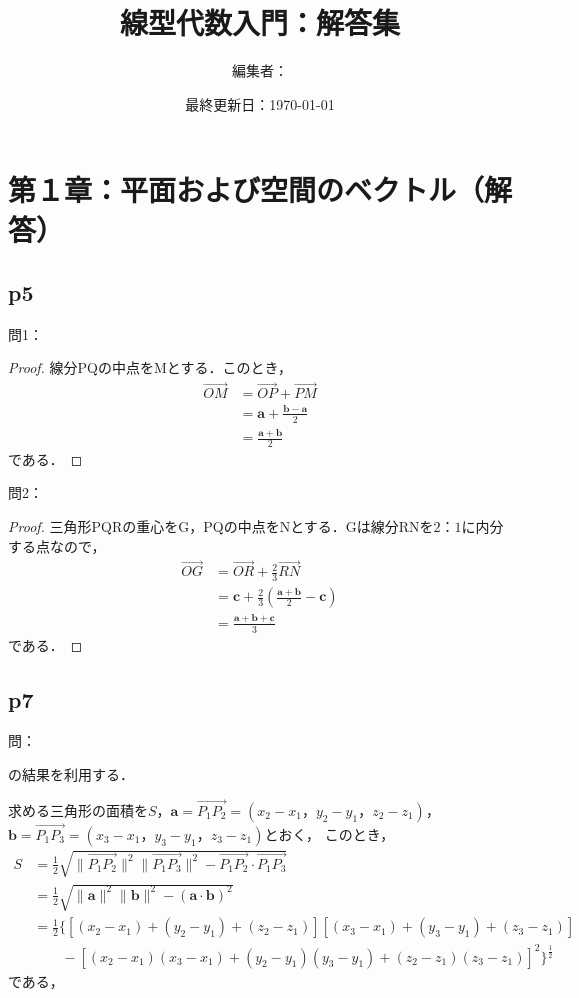 \documentclass[dvipdfmx,uplatex,11pt]{jsarticle}
\title{線型代数入門：解答集}
\author{編集者：}
\date{最終更新日：\today}
\begin{document}
\maketitle
\tableofcontents
\newpage
%
%
%
\section{第１章：平面および空間のベクトル（解答）}
%
\subsection{p5}

問1：

\begin{leftbar}
	\begin{proof}
		線分PQの中点をMとする．このとき，
		\begin{align*}
		\overrightarrow{OM} & = \overrightarrow{OP} + \overrightarrow{PM} \\
		& = \bm{a} + \frac{\bm{b}-\bm{a}}{2} \\
		& = \frac{\bm{a}+\bm{b}}{2}
		\end{align*}
		である．
	\end{proof}
\end{leftbar}

問2：
\begin{leftbar}
	\begin{proof}
		三角形PQRの重心をG，PQの中点をNとする．Gは線分RNを$2：1$に内分する点なので，
		\begin{align*}
			\overrightarrow{OG} &= \overrightarrow{OR} + \frac{2}{3} \overrightarrow{RN} \\
			& = \bm{c}+ \frac{2}{3} \left(\frac{\bm{a}+\bm{b}}{2}-\bm{c} \right)\\
			& = \frac{\bm{a}+\bm{b}+\bm{c}}{3}
		\end{align*}
		である．
	\end{proof}
\end{leftbar}

\newpage

\subsection{p7}

問： 
\begin{leftbar}
	[1.4]の結果を利用する．\par 
	求める三角形の面積を$S$，$\bm{a}=\overrightarrow{P_1 P_2}=(x_2-x_1，y_2-y_1，z_2-z_1)$，$\bm{b}=\overrightarrow{P_1 P_3}=(x_3-x_1，y_3-y_1，z_3-z_1)$とおく，
	このとき，
	\begin{align*}
		S & = \frac{1}{2} \sqrt{\|\overrightarrow{P_1 P_2}\|^2 \|\overrightarrow{P_1 P_3}\|^2 - \overrightarrow{P_1 P_2} \cdot \overrightarrow{P_1 P_3}} \\
		  & = \frac{1}{2} \sqrt{\|\bm{a}\|^2 \|\bm{b}\|^2 - (\bm{a}\cdot \bm{b})^2 } \\
		  & = \frac{1}{2} \{[(x_2 - x_1)+(y_2-y_1)+ (z_2 - z_1)][(x_3 - x_1)+(y_3-y_1)+ (z_3 - z_1)]\\
		  & \qquad - [(x_2-x_1)(x_3-x_1)+(y_2 -y_1)(y_3-y_1)+(z_2-z_1)(z_3-z_1)]^2\}^{\frac{1}{2}}
	\end{align*}
	である，
\end{leftbar}
	
\end{document}
